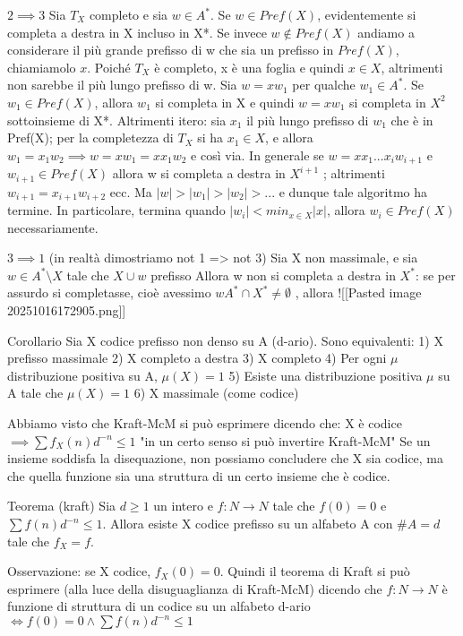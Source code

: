 $2 \implies 3$
Sia $T_X$ completo e sia $w \in A^*$.
Se $w \in Pref(X)$, evidentemente si completa a destra in X incluso in X*.
Se invece $w \notin Pref(X)$ andiamo a considerare il più grande prefisso di w che sia un prefisso in $Pref(X)$, chiamiamolo $x$. Poiché $T_X$ è completo, x è una foglia e quindi $x \in X$, altrimenti non sarebbe il più lungo prefisso di w.
Sia $w=xw_1$ per qualche $w_1 \in A^*$.
Se $w_1 \in Pref(X)$, allora $w_1$ si completa in X e quindi $w=xw_1$ si completa in $X^2$ sottoinsieme di X*.
Altrimenti itero: sia $x_1$ il più lungo prefisso di $w_1$ che è in Pref(X); per la completezza di $T_X$ si ha $x_1 \in X$, e allora $w_1=x_1w_2 \implies w=xw_1=xx_1w_2$ e così via.
In generale se $w=xx_1...x_iw_{i+1}$ e $w_{i+1}\in Pref(X)$ allora w si completa a destra in $X^{i+1}$ ; altrimenti $w_{i+1}=x_{i+1}w_{i+2}$ ecc.
Ma $|w| \gt |w_1| \gt |w_2| \gt ...$ e dunque tale algoritmo ha termine. In particolare, termina quando $|w_i| \lt min_{x\in X}|x|$, allora $w_i \in Pref(X)$ necessariamente.

$3 \implies 1$
(in realtà dimostriamo not 1 => not 3)
Sia X non massimale, e sia $w \in A^*\setminus X$ tale che $X \cup {w}$ prefisso
Allora w non si completa a destra in $X^*$: se per assurdo si completasse, cioè avessimo ${w}A^*\cap X^* \neq \emptyset$ , allora 
![[Pasted image 20251016172905.png]]

Corollario
Sia X codice prefisso non denso su A (d-ario). Sono equivalenti:
1) X prefisso massimale
2) X completo a destra
3) X completo
4) Per ogni $\mu$ distribuzione positiva su A, $\mu(X) = 1$
5) Esiste una distribuzione positiva $\mu$ su A tale che $\mu(X)=1$
6) X massimale (come codice)

Abbiamo visto che Kraft-McM si può esprimere dicendo che: X è codice $\implies \sum f_X(n)d^{-n} \le 1$
"in un certo senso si può invertire Kraft-McM"
Se un insieme soddisfa la disequazione, non possiamo concludere che X sia codice, ma che quella funzione sia una struttura di un certo insieme che è codice.

Teorema (kraft)
Sia $d\ge 1$ un intero e $f:N \to N$ tale che $f(0)=0$ e $\sum f(n) d^{-n} \le 1$.
Allora esiste X codice prefisso su un alfabeto A con $\#A=d$ tale che $f_X=f$.

Osservazione: se X codice, $f_X(0)=0$. Quindi il teorema di Kraft si può esprimere (alla luce della disuguaglianza di Kraft-McM) dicendo che $f:N \to N$ è funzione di struttura di un codice su un alfabeto d-ario $\iff f(0) = 0 \land \sum f(n)d^{-n} \le 1$

